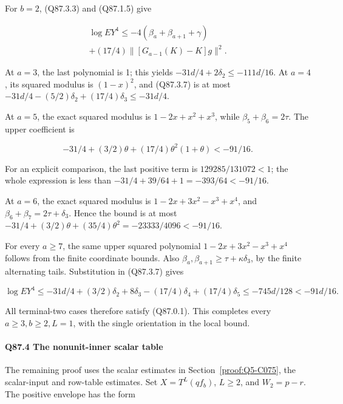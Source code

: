 For \(b=\allowbreak 2\), (Q87.3.3) and (Q87.1.5) give

\[
\begin{gathered}
\log EY^4\le-4(\beta_a+\beta_{a+1}+\gamma)\\
+(17/4)\|[G_{a-1}(K)-K]g\|^2.
\end{gathered}\tag{Q87.3.7}\label{eq:Q87:3.7}
\]

At \(a=\allowbreak 3\), the last polynomial is 1; this yields
\(-31d/4+2\delta_2\le\allowbreak -111d/16\).
At \(a=\allowbreak 4\), its squared modulus is \((1-x)^2\), and (Q87.3.7)
is at most \(-31d/4-(5/2)\delta_2+(17/4)\delta_3\le\allowbreak -31d/4\).

At \(a=\allowbreak 5\), the exact squared modulus is
\(1-2x+x^2+x^3\), while \(\beta_5+\beta_6=\allowbreak 2\tau\).
The upper coefficient is

\[
 -31/4+(3/2)\theta+(17/4)\theta^2(1+\theta)<-91/16.
\]

For an explicit comparison, the last positive term is
\(129285/131072<\allowbreak 1\); the whole expression is less than
\(-31/4+39/64+1=\allowbreak -393/64<\allowbreak -91/16\).

At \(a=\allowbreak 6\), the exact squared modulus is
\(1-2x+3x^2-x^3+x^4\), and
\(\beta_6+\beta_7=\allowbreak 2\tau+\delta_3\). Hence the bound is at most
\(-31/4+(3/2)\theta+(35/4)\theta^2=\allowbreak -23333/4096<\allowbreak -91/16\).

For every \(a\ge\allowbreak 7\), the same upper squared polynomial
\(1-2x+3x^2-x^3+x^4\) follows from the finite coordinate bounds.
Also \(\beta_a,\allowbreak  \beta_{a+1}\ge\allowbreak \tau+\kappa \delta_3\), by the finite
alternating tails. Substitution in (Q87.3.7) gives

\[
 \log EY^4\le-31d/4+(3/2)\delta_2+8\delta_3
 -(17/4)\delta_4+(17/4)\delta_5
 \le-745d/128<-91d/16.
\]

All terminal-two cases therefore satisfy (Q87.0.1). This completes every
\(a\ge\allowbreak 3,\allowbreak  b\ge\allowbreak 2,\allowbreak  L=\allowbreak 1\), with the single orientation in the local bound.

\paragraph{Q87.4 The nonunit-inner scalar table}\label{part:Q87.4}

The remaining proof uses the scalar estimates in Section~\ref{proof:Q5-C075}, the scalar-input and row-table estimates.
Set \(X=\allowbreak T^L(qf_b)\), \(L\ge\allowbreak 2\), and \(W_2=\allowbreak p-r\). The
positive envelope has the form


